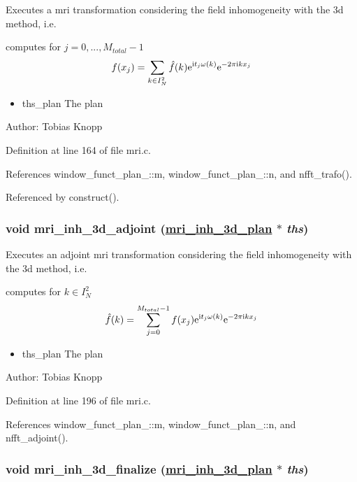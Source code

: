 Executes a mri transformation considering the field inhomogeneity with the 3d method, i.e. 

computes for $j=0,...,M_{total}-1$ \[ f(x_j) = \sum_{k \in I_N^2} \hat{f}(k) {\rm e}^{\mbox{\rm\scriptsize i} t_j \omega(k)} {\rm e}^{-2 \pi \mbox{\rm\scriptsize i} k x_j} \]

\begin{itemize}
\item ths\_\-plan The plan\end{itemize}
\begin{Desc}
\item[Author:]Tobias Knopp \end{Desc}


Definition at line 164 of file mri.c.

References window\_\-funct\_\-plan\_\-::m, window\_\-funct\_\-plan\_\-::n, and nfft\_\-trafo().

Referenced by construct().\hypertarget{group__mri_ga5}{
\subsubsection[mri\_\-inh\_\-3d\_\-adjoint]{\setlength{\rightskip}{0pt plus 5cm}void mri\_\-inh\_\-3d\_\-adjoint (\hyperlink{structmri__inh__3d__plan}{mri\_\-inh\_\-3d\_\-plan} $\ast$ {\em ths})}}
\label{group__mri_ga5}


Executes an adjoint mri transformation considering the field inhomogeneity with the 3d method, i.e. 

computes for $k \in I_N^2$ \[ \hat{f}(k) = \sum_{j=0}^{M_{total}-1} f(x_j) {\rm e}^{\mbox{\rm\scriptsize i} t_j \omega(k)} {\rm e}^{-2 \pi \mbox{\rm\scriptsize i} k x_j} \]

\begin{itemize}
\item ths\_\-plan The plan\end{itemize}
\begin{Desc}
\item[Author:]Tobias Knopp \end{Desc}


Definition at line 196 of file mri.c.

References window\_\-funct\_\-plan\_\-::m, window\_\-funct\_\-plan\_\-::n, and nfft\_\-adjoint().\hypertarget{group__mri_ga7}{
\subsubsection[mri\_\-inh\_\-3d\_\-finalize]{\setlength{\rightskip}{0pt plus 5cm}void mri\_\-inh\_\-3d\_\-finalize (\hyperlink{structmri__inh__3d__plan}{mri\_\-inh\_\-3d\_\-plan} $\ast$ {\em ths})}}
\label{group__mri_ga7}


